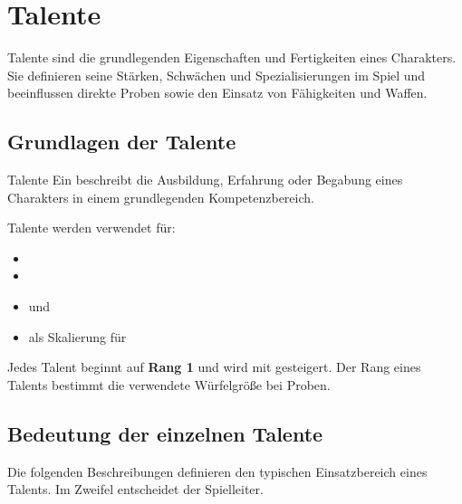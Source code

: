 \chapter{Talente}

Talente sind die grundlegenden Eigenschaften und Fertigkeiten eines Charakters.
Sie definieren seine Stärken, Schwächen und Spezialisierungen im Spiel und
beeinflussen direkte Proben sowie den Einsatz von Fähigkeiten und Waffen.

\section{Grundlagen der Talente}

\begin{rulebox}{Talente}
	Ein  beschreibt die Ausbildung, Erfahrung oder Begabung
	eines Charakters in einem grundlegenden Kompetenzbereich.
\end{rulebox}

Talente werden verwendet für:
\begin{itemize}
	\item {}
	\item {}
	\item {} und  
	\item als Skalierung für  
\end{itemize}

Jedes Talent beginnt auf \textbf{Rang 1} und wird mit
 gesteigert.
Der Rang eines Talents bestimmt die verwendete Würfelgröße bei Proben.

\section{Bedeutung der einzelnen Talente}

Die folgenden Beschreibungen definieren den typischen Einsatzbereich eines Talents.
Im Zweifel entscheidet der Spielleiter.

